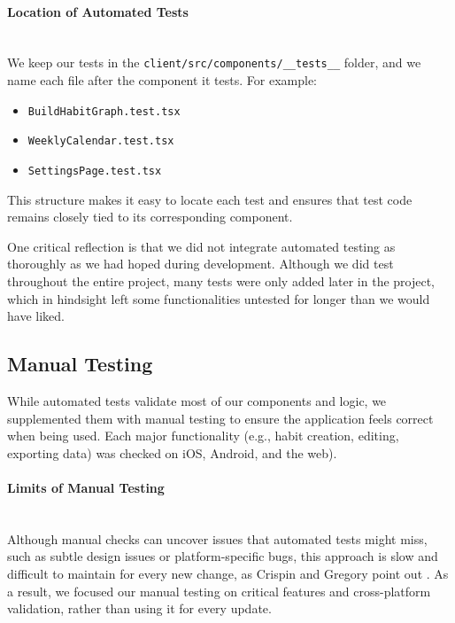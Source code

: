 \paragraph{Location of Automated Tests}\mbox{}\\

We keep our tests in the \texttt{client/src/components/\_\_tests\_\_} folder, and we name each file after the component it tests. For example:

\begin{itemize} \item \texttt{BuildHabitGraph.test.tsx}\item \texttt{WeeklyCalendar.test.tsx} \item \texttt{SettingsPage.test.tsx} \end{itemize}

This structure makes it easy to locate each test and ensures that test code remains closely tied to its corresponding component.

One critical reflection is that we did not integrate automated testing as thoroughly as we had hoped during development. Although we did test throughout the entire project, many tests were only added later in the project, which in hindsight left some functionalities untested for longer than we would have liked.

\subsection{Manual Testing}

While automated tests validate most of our components and logic, we supplemented them with manual testing to ensure the application feels correct when being used. Each major functionality (e.g., habit creation, editing, exporting data) was checked on iOS, Android, and the web).

\paragraph{Limits of Manual Testing}\mbox{}\\
Although manual checks can uncover issues that automated tests might miss, such as subtle design issues or platform-specific bugs, this approach is slow and difficult to maintain for every new change, as Crispin and Gregory point out \cite{crispin2009agiletesting}. As a result, we focused our manual testing on critical features and cross-platform validation, rather than using it for every update.


